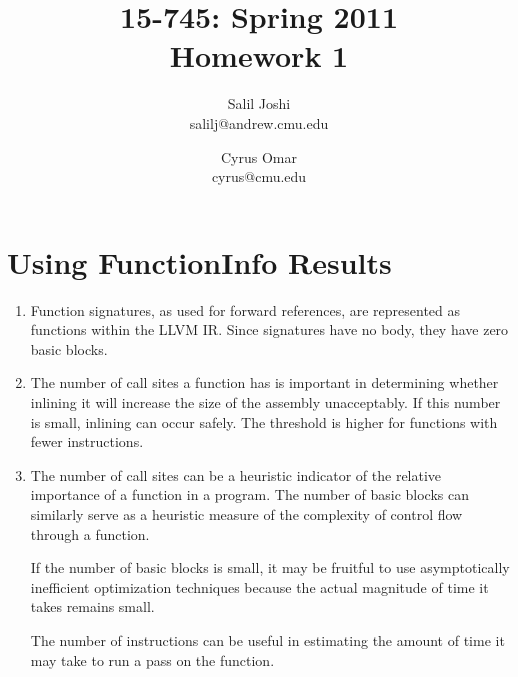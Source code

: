\documentclass[12pt]{article}
\title{{\small 15-745: Spring 2011}\\Homework 1}
\author{Salil Joshi\\
salilj@andrew.cmu.edu
\and
Cyrus Omar\\
cyrus@cmu.edu
}
\date{}                                           %
\begin{document}
\maketitle
\section{Using FunctionInfo Results}
\begin{enumerate}
\item Function signatures, as used for forward references, are represented as functions within the LLVM IR. Since signatures have no body, they have zero basic blocks.
\item The number of call sites a function has is important in determining whether inlining it will increase the size of the assembly unacceptably. If this number is small, inlining can occur safely. The threshold is higher for functions with fewer instructions.
\item The number of call sites can be a heuristic indicator of the relative importance of a function in a program. The number of basic blocks can similarly serve as a heuristic measure of the complexity of control flow through a function. 

If the number of basic blocks is small, it may be fruitful to use asymptotically inefficient optimization techniques because the actual magnitude of time it takes remains small.

The number of instructions can be useful in estimating the amount of time it may take to run a pass  on the function.
\end{enumerate}
\end{document}
